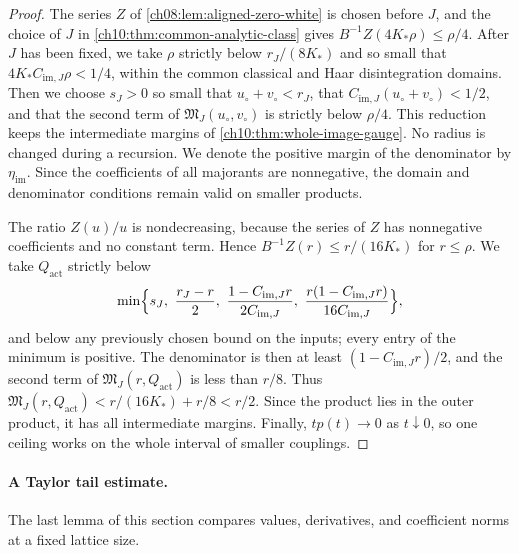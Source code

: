 \begin{proof}
The series $Z$ of \cref{ch08:lem:aligned-zero-white} is chosen before $J$, and the choice of $J$ in \cref{ch10:thm:common-analytic-class} gives $B^{-1}Z(4K_*\rho)\le\rho/4$. After $J$ has been fixed, we take $\rho$ strictly below $r_J/(8K_*)$ and so small that $4K_*C_{\mathrm{im},J}\rho<1/4$, within the common classical and Haar disintegration domains. Then we choose $s_J>0$ so small that $u_\circ+v_\circ<r_J$, that $C_{\mathrm{im},J}(u_\circ+v_\circ)<1/2$, and that the second term of $\mathfrak M_J(u_\circ,v_\circ)$ is strictly below $\rho/4$. This reduction keeps the intermediate margins of \cref{ch10:thm:whole-image-gauge}. No radius is changed during a recursion. We denote the positive margin of the denominator by $\eta_{\mathrm{im}}$. Since the coefficients of all majorants are nonnegative, the domain and denominator conditions remain valid on smaller products.

The ratio $Z(u)/u$ is nondecreasing, because the series of $Z$ has nonnegative coefficients and no constant term. Hence $B^{-1}Z(r)\le r/(16K_*)$ for $r\le\rho$. We take $Q_{\mathrm{act}}$ strictly below
\[
 \min\Bigl\{s_J,\ \frac{r_J-r}{2},\ \frac{1-C_{\mathrm{im},J}r}{2C_{\mathrm{im},J}},\
 \frac{r(1-C_{\mathrm{im},J}r)}{16C_{\mathrm{im},J}}\Bigr\},
\]
and below any previously chosen bound on the inputs; every entry of the minimum is positive. The denominator is then at least $(1-C_{\mathrm{im},J}r)/2$, and the second term of $\mathfrak M_J(r,Q_{\mathrm{act}})$ is less than $r/8$. Thus $\mathfrak M_J(r,Q_{\mathrm{act}})<r/(16K_*)+r/8<r/2$. Since the product lies in the outer product, it has all intermediate margins. Finally, $tp(t)\to0$ as $t\downarrow0$, so one ceiling works on the whole interval of smaller couplings.
\end{proof}

\paragraph{A Taylor tail estimate.}
The last lemma of this section compares values, derivatives, and coefficient norms at a fixed lattice size.

